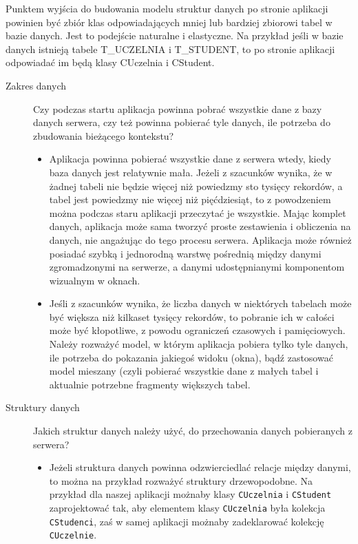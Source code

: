 Punktem wyjścia do budowania modelu struktur danych po stronie aplikacji powinien być zbiór
klas odpowiadających mniej lub bardziej zbiorowi tabel w bazie danych. Jest to podejście naturalne
i elastyczne. Na przykład jeśli w bazie danych istnieją tabele T\_UCZELNIA i T\_STUDENT, to
po stronie aplikacji odpowiadać im będą klasy CUczelnia i CStudent.

\begin{description}
\item [Zakres danych] Czy podczas startu aplikacja powinna pobrać wszystkie dane z bazy danych serwera, czy
też powinna pobierać tyle danych, ile potrzeba do zbudowania bieżącego kontekstu? 
	\begin{itemize}
	\item Aplikacja powinna pobierać wszystkie dane z serwera wtedy, kiedy baza danych jest relatywnie
	      mała. Jeżeli z szacunków wynika, że w żadnej tabeli nie będzie więcej niż powiedzmy sto
	      tysięcy rekordów, a tabel jest powiedzmy nie więcej niż pięćdziesiąt, to z powodzeniem
	      można podczas staru aplikacji przeczytać je wszystkie. Mając komplet danych, aplikacja może
	      sama tworzyć proste zestawienia i obliczenia na danych, nie angażując do tego procesu serwera.
	      Aplikacja może również posiadać szybką i
	      jednorodną warstwę pośrednią między danymi zgromadzonymi na serwerze, a danymi udostępnianymi
	      komponentom wizualnym w oknach.
	\item Jeśli z szacunków wynika, że liczba danych w niektórych tabelach może być większa niż
	      kilkaset tysięcy rekordów, to pobranie ich w całości może być kłopotliwe, z powodu
	      ograniczeń czasowych i pamięciowych. Należy rozważyć model, w którym aplikacja pobiera
	      tylko tyle danych, ile potrzeba do pokazania jakiegoś widoku (okna), bądź zastosować model
	      mieszany (czyli pobierać wszystkie dane z małych tabel i aktualnie potrzebne fragmenty
	      większych tabel.
	\end{itemize}
\item [Struktury danych] Jakich struktur danych należy użyć, do przechowania danych pobieranych z serwera?
	\begin{itemize}
	\item Jeżeli struktura danych powinna odzwierciedlać relacje między danymi, to można na przykład rozważyć
	struktury drzewopodobne. Na przykład dla naszej aplikacji możnaby klasy {\tt CUczelnia} i
	{\tt CStudent} zaprojektować tak, aby elementem klasy {\tt CUczelnia} była kolekcja {\tt CStudenci}, zaś
	w samej aplikacji możnaby zadeklarować kolekcję {\tt CUczelnie}. 


\end{itemize}
\end{description}
